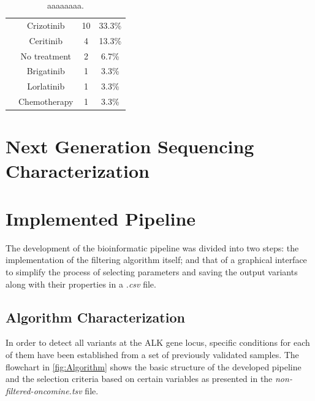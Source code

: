 \begin{table}[ht]
{\begin{tabular}{cccc}
\rowcolor[HTML]{FFFFFF}
\cellcolor[HTML]{FFFFFF} & Crizotinib & 10 & 33.3\% \\
\rowcolor[HTML]{FFFFFF}
\cellcolor[HTML]{FFFFFF} & Ceritinib & 4 & 13.3\% \\
\rowcolor[HTML]{FFFFFF}
\cellcolor[HTML]{FFFFFF} & No treatment & 2 & 6.7\% \\
\rowcolor[HTML]{FFFFFF}
\cellcolor[HTML]{FFFFFF} & Brigatinib & 1 & 3.3\% \\
\rowcolor[HTML]{FFFFFF}
\cellcolor[HTML]{FFFFFF} & Lorlatinib & 1 & 3.3\% \\
\rowcolor[HTML]{FFFFFF}
\multirow{-7}{*}{\cellcolor[HTML]{FFFFFF}\textbf{Treatment}} & Chemotherapy & 1 & 3.3\%
\end{tabular}}
\caption{aaaaaaaa.}
\label{tab:Patients}
\end{table}

\section{Next Generation Sequencing Characterization}


\section{Implemented Pipeline}

The development of the bioinformatic pipeline was divided into two steps: the implementation of the filtering algorithm itself; and that of a graphical interface to simplify the process of selecting parameters and saving the output variants along with their properties in a \textit{.csv} file.

\subsection{Algorithm Characterization}

In order to detect all variants at the ALK gene locus, specific conditions for each of them have been established from a set of previously validated samples. The flowchart in \autoref{fig:Algorithm} shows the basic structure of the developed pipeline and the selection criteria based on certain variables as presented in the \textit{non-filtered-oncomine.tsv} file.

